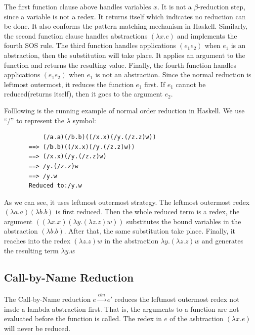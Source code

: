 The first function clause above handles variables $x$. It is not a $\beta$-reduction step, since a variable is not a redex. It returns itself which indicates no reduction can be done. It also conforms the pattern matching mechanism in Haskell. Similarly, the second function clause handles abstractions $(\lambda x.e)$ and implements the fourth SOS rule. The third function handles applications $(e_1e_2)$ when $e_1$ is an abstraction, then the substitution will take place. It applies an argument to the function and returns the resulting value. Finally, the fourth function handles  applications $(e_1e_2)$ when $e_1$ is not an abstraction. Since the normal reduction is leftmost outermost, it reduces the function $e_1$ first. If $e_1$ cannot be reduced(returns itself), then it goes to the argument $e_2$. 

\begin{exmp}
\normalfont Folllowing is the running example of normal order reduction in Haskell. We use ``/'' to represent the $\lambda$ symbol:
\end{exmp}

\begin{verbatim}
           (/a.a)(/b.b)((/x.x)(/y.(/z.z)w))
       ==> (/b.b)((/x.x)(/y.(/z.z)w))
       ==> (/x.x)(/y.(/z.z)w)
       ==> /y.(/z.z)w
       ==> /y.w
       Reduced to:/y.w
\end{verbatim}


As we can see, it uses leftmost outermost strategy. The leftmost outermost redex $(\lambda a.a)(\lambda b.b)$ is first reduced. Then the whole reduced term is a redex, the argument $((\lambda x.x)(\lambda y.(\lambda z.z)w))$ substitutes the bound variables in the abstraction $(\lambda b.b)$. After that, the same substitution take place. Finally, it reaches into the redex $(\lambda z.z)w$ in the abstraction $\lambda y.(\lambda z.z)w$ and generates the resulting term $\lambda y.w$


\subsection{Call-by-Name Reduction}{\label{subsec:cbn}}

The Call-by-Name reduction $e\xrightarrow{cbn} e'$ reduces the leftmost outermost redex not insde a lambda abstraction first. That is, the arguments to a function are not evaluated before the function is called. The redex in $e$ of the asbtraction $(\lambda x.e)$ will never be reduced. 


